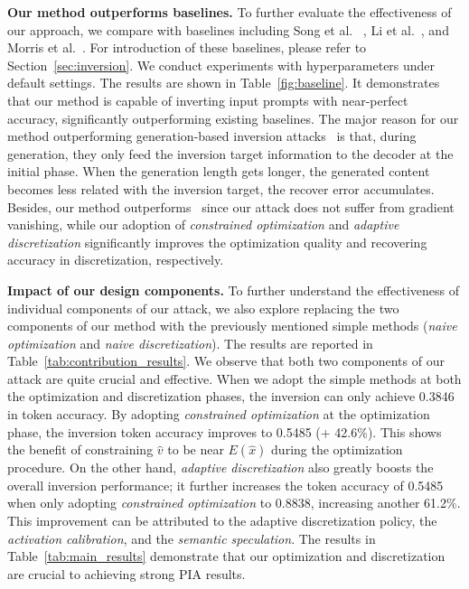 \noindent \textbf{Our method outperforms baselines.} To further evaluate the effectiveness of our approach, we compare with baselines including Song et al. ~\cite{song2020information}, Li et al.~\cite{Generative-embedding-inversion-attack}, and Morris et al.~\cite{morris2023language}. For introduction of these baselines, please refer to Section~\ref{sec:inversion}. We conduct experiments with hyperparameters  under  default settings. The results are shown in Table~\ref{fig:baseline}.  It demonstrates that our method is capable of inverting input prompts with near-perfect accuracy, significantly outperforming existing baselines. 
The major reason for our method outperforming generation-based inversion attacks~\cite{Generative-embedding-inversion-attack,morris2023language} is that, during generation, they only feed the inversion target information to the decoder at the initial phase. When the generation length gets longer, the generated content becomes less related  with the inversion target, the recover error accumulates. Besides, our method outperforms~\cite{song2020information} since our attack does not suffer from gradient vanishing, while our adoption of \textit{constrained optimization} and \textit{adaptive discretization} significantly improves the optimization quality and recovering accuracy in discretization, respectively. 

\noindent\textbf{Impact of our design components.} 
To further understand the effectiveness of individual components of our attack, we also explore replacing the two components of our method with the previously mentioned simple methods (\textit{naive optimization} and \textit{naive discretization}). The results are reported in Table~\ref{tab:contribution_results}. We observe that both two components of our attack are quite crucial and effective. When we adopt the simple methods at both the optimization and discretization phases, the inversion can only achieve 0.3846 in token accuracy. By adopting \textit{constrained optimization} at the optimization phase, the inversion token accuracy improves to 0.5485 (+ 42.6\%). This shows the benefit of constraining $\hat{v}$ to be near $E(\hat{x})$ during the optimization procedure. On the other hand, \textit{adaptive discretization} also greatly boosts the overall inversion performance; it further increases the token accuracy of 0.5485 when only adopting \textit{constrained optimization} to 0.8838, increasing another 61.2\%. This improvement can be attributed to the adaptive discretization policy, the \textit{activation calibration}, and the \textit{semantic speculation}. The results in Table~\ref{tab:main_results} demonstrate that our optimization and discretization are crucial to achieving strong PIA results.




